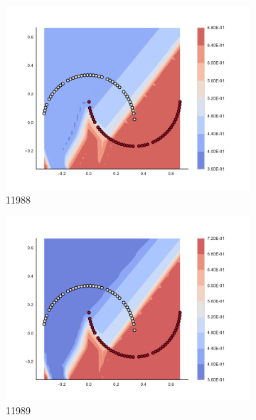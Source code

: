 \begin{figure}[h]
\begin{subfigure}[b]{0.09\textwidth}
    \includegraphics[clip, trim=2.35cm 1.75cm 4.5cm 0cm,width=\textwidth]{img/convergence/11988.pdf}
    \caption{11988}
    \label{fig:convergence_11988}
\end{subfigure}
%
\begin{subfigure}[b]{0.09\textwidth}
    \includegraphics[clip, trim=2.35cm 1.75cm 4.5cm 0cm,width=\textwidth]{img/convergence/11989.pdf}
    \caption{11989}
    \label{fig:convergence_11989}
\end{subfigure}
%
\begin{subfigure}[b]{0.09\textwidth}

\end{subfigure}
\end{figure}
